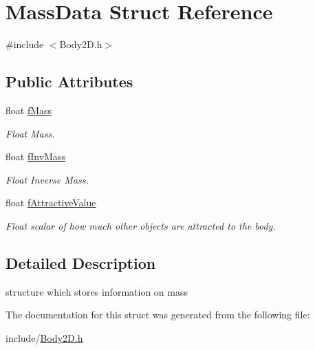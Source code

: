 \hypertarget{struct_mass_data}{\section{Mass\+Data Struct Reference}
\label{struct_mass_data}
}


{\ttfamily \#include $<$Body2\+D.\+h$>$}

\subsection*{Public Attributes}
\begin{DoxyCompactItemize}
\item 
\hypertarget{struct_mass_data_a7c28659bb358f0a22fb909dc394e51af}{float \hyperlink{struct_mass_data_a7c28659bb358f0a22fb909dc394e51af}{f\+Mass}}\label{struct_mass_data_a7c28659bb358f0a22fb909dc394e51af}

\begin{DoxyCompactList}\small\item\em Float Mass. \end{DoxyCompactList}\item 
\hypertarget{struct_mass_data_a927ec9b0975da4fe138f3dcae2ee9c41}{float \hyperlink{struct_mass_data_a927ec9b0975da4fe138f3dcae2ee9c41}{f\+Inv\+Mass}}\label{struct_mass_data_a927ec9b0975da4fe138f3dcae2ee9c41}

\begin{DoxyCompactList}\small\item\em Float Inverse Mass. \end{DoxyCompactList}\item 
\hypertarget{struct_mass_data_acb9e284ee199bb53de8bd24db5716959}{float \hyperlink{struct_mass_data_acb9e284ee199bb53de8bd24db5716959}{f\+Attractive\+Value}}\label{struct_mass_data_acb9e284ee199bb53de8bd24db5716959}

\begin{DoxyCompactList}\small\item\em Float scalar of how much other objects are attracted to the body. \end{DoxyCompactList}\end{DoxyCompactItemize}


\subsection{Detailed Description}
structure which stores information on mass 

The documentation for this struct was generated from the following file\+:\begin{DoxyCompactItemize}
\item 
include/\hyperlink{_body2_d_8h}{Body2\+D.\+h}\end{DoxyCompactItemize}
